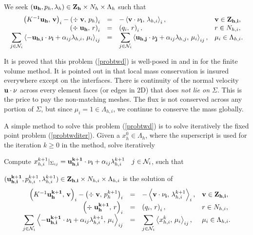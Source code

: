 \documentclass{article}
\newcommand{\bral}{\left<}
\newcommand{\brar}{\right>}
\newcommand{\Nui}[1]{{\mathcal N}_{#1}}
\newcommand{\dps}{\displaystyle}
\begin{document}
We seek $({\bf u_h}, p_h, \lambda_h) \in {\bf Z_h} \times N_h \times \Lambda_h$
such that
\begin{equation}\label{probtwd}\begin{array}{rcll}
\left( K^{-1}{\bf u_h},\, {\bf v} \right)_{i} - 
\left( \div\; {\bf v}, \, p_h \right)_{i}  & = & \dps 
- \bral {\bf v \cdot  \nu_i} , \, \lambda_{h,i} \brar_{i},  & {\bf v} \in {\bf Z_{h,i}}, \\
\left( \div\; {\bf u_h}, \, r \right)_{i} &= &
 \left(q_i, \, r \right)_{i},  & r \in N_{h,i},\\
\dps \sum_{j \in \Nui{i}} \bral - {\bf u_{h,i} \cdot  \nu_i}  + 
\alpha_{ij} \lambda_{h,i}  , 
\, \mu_{i} \brar_{ij} & = & 
\dps \sum_{j \in \Nui{i}} \bral {\bf u_{h,j} \cdot  \nu_j}  + 
\alpha_{ij} \lambda_{h,j}  , 
\, \mu_{i} \brar_{ij},  & \mu_{i} \in \Lambda_{h,i}.\\
\end{array}\end{equation}

It is proved that this problem (\ref{probtwd}) is well-posed in
\cite{MR98j:76083} and in \cite{vfcement-1999} for the finite volume method. It
is pointed out in \cite{MR98j:76083} that local mass conservation is insured
everywhere except on the interfaces. There is continuity of the normal
velocity ${\bf u \cdot \nu}$ across every element faces (or edges in 2D) that
does \emph{not lie on $\Sigma$}. This is the price to pay the non-matching meshes. The
flux is not conserved across any portion of $\Sigma$, but since $\mu_i = 1 \in
\Lambda_{h,i}$, we continue to conserve the mass globally.

A simple method to solve this problem (\ref{probtwd}) is to solve iteratively
the fixed point problem (\ref{probtwditer}). Given a $x^{0}_{h} \in
\Lambda_{h}$, where the superscript is used for the iteration $k \geq 0$ in the
method, solve iteratively

Compute $x^{k+1}_{h,i}|_{\Sigma_{ij}} =  
{\bf u^{k+1}_{h,i} \cdot \nu_i}  + \alpha_{ij} \lambda^{k+1}_{h,i} 
\quad j \in \Nui{i}$,  such that
 
$({\bf u^{k+1}_{h,i}}, p^{k+1}_{h,i}, \lambda^{k+1}_{h,i}) 
\in {\bf Z_{h,i}} \times N_{h,i} \times \Lambda_{h,i}$
is the solution of 
\begin{equation}\label{probtwditer}\begin{array}{rcll}
\left( K^{-1}{\bf u^{k+1}_h},\, {\bf v} \right)_{i} - 
\left( \div\; {\bf v}, \, p^{k+1}_h \right)_{i}  & = & \dps 
- \bral {\bf v \cdot \nu_i} , \, \lambda^{k+1}_{h,i} \brar_{i},  & {\bf v} 
\in {\bf Z_{h,i}}, \\
\left( \div\; {\bf u^{k+1}_h}, \, r \right)_{i} &= &
 \left(q_i, \, r \right)_{i},  & r \in N_{h,i},\\
\dps \sum_{j \in \Nui{i}} \bral - {\bf u^{k+1}_{h,i} \cdot \nu_i}  + 
\alpha_{ij} \lambda^{k+1}_{h,i}  , 
\, \mu_{i} \brar_{ij} & = & 
\dps \sum_{j \in \Nui{i}} \bral x^{k}_{h,i}  , 
\, \mu_{i} \brar_{ij},  & \mu_{i} \in \Lambda_{h,i}.\\
\end{array}\end{equation}
\end{document}
